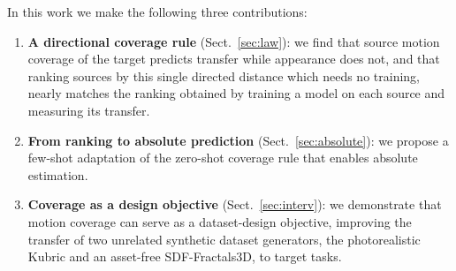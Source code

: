 \begin{table}[tbp]
\centering
\caption{\textbf{Transfer study.} Four architectures over 11 training
sources, evaluated by peak \pck{} at $\alpha{=}5\%$ on 9 target benchmarks. Backbones are frozen
(\encfrozen) or fine-tuned (\enctrained); RAFT has none and trains end-to-end.
\emph{Real-motion} datasets carry dense pixel-motion ground truth, \emph{semantic}
datasets use sparse keypoints.}
\label{tab:study}
\footnotesize

\end{table}

In this work we make the following three contributions:
\begin{enumerate}
\item \textbf{A directional coverage rule} (Sect.~\ref{sec:law}): we find that source motion
  coverage of the target predicts transfer while appearance does not, and that ranking
  sources by this single directed distance which needs no training, nearly matches the
  ranking obtained by training a model on each source and measuring its transfer.
\item \textbf{From ranking to absolute prediction} (Sect.~\ref{sec:absolute}): we
  propose a few-shot adaptation of the zero-shot coverage rule that enables absolute
  \pck{} estimation.
\item \textbf{Coverage as a design objective} (Sect.~\ref{sec:interv}): we demonstrate
  that motion coverage can serve as a dataset-design objective, improving the transfer
  of two unrelated synthetic dataset generators, the photorealistic Kubric and an asset-free
  SDF-Fractals3D, to target tasks.
\end{enumerate}

